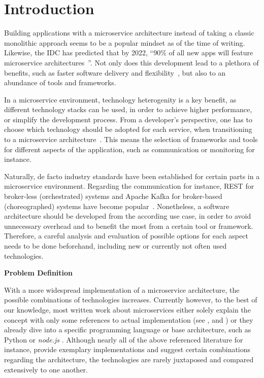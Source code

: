 \chapter{Introduction}\label{cha:Introdction}

Building applications with a microservice architecture instead of taking a classic monolithic approach seems to be a popular mindset as of the time of writing.
Likewise, the IDC has predicted that by 2022, \enquote{90{\%} of all new apps will feature microservice architectures~\cite{Columbus.20181104T12:45:03.42905:00}}.
Not only does this development lead to a plethora of benefits, such as faster software delivery and flexibility~\cite[p.~15]{Newman.2015}, but also to an abundance of tools and frameworks.

In a microservice environment, technology heterogenity is a key benefit, as different technology stacks can be used, in order to achieve higher performance, or simplify the development process.
From a developer's perspective, one has to choose which technology should be adopted for each service, when transitioning to a microservice architecture~\cite[p.~20]{Newman.2015}.
This means the selection of frameworks and tools for different aspects of the application, such as communication or monitoring for instance.

Naturally, de facto industry standards have been established for certain parts in a microservice environment.
Regarding the communication for instance, \ac{REST} for broker-less (orchestrated) systems and Apache Kafka for broker-based (choreographed) systems have become popular~\cite{NoorainPanjwani.2020}.
Nonetheless, a software architecture should be developed from the according use case, in order to avoid unnecessary overhead and to benefit the most from a certain tool or framework.
Therefore, a careful analysis and evaluation of possible options for each aspect needs to be done beforehand, including new or currently not often used technologies.

\textbf{Problem Definition}\label{sec:ProblemDefinition}

With a more widespread implementation of a microservice architecture, the possible combinations of technologies increases.
Currently however, to the best of our knowledge, most written work about microservices either solely explain the concept with only some references to actual implementation (see \cite{Bruce.2019}, \cite{Newman.2015} and \cite{Newman.2019}) or they already dive into a specific programming language or base architecture, such as Python \cite{Ziade.2017} or \textit{node.js} \cite{Resende.2018}.
Although nearly all of the above referenced literature for instance, provide exemplary implementations and suggest certain combinations regarding the architecture, the technologies are rarely juxtaposed and compared extensively to one another.


